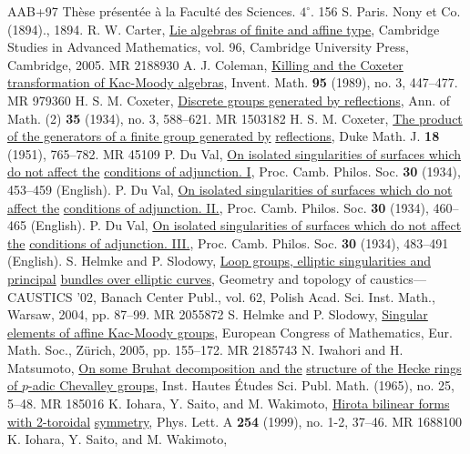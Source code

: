 \documentclass[11pt]{amsart}
\begin{document}
{\begin{thebibliography}{AAB+97}
Th\`{e}se pr\'{e}sent\'{e}e \`{a} la Facult\'{e} des Sciences. $4^{\circ}$. 156 S. Paris. 
Nony et Co. (1894)., 1894.
R. W. Carter, 
\underline{Lie algebras of finite and affine type}, 
Cambridge Studies in Advanced Mathematics, vol. 96, Cambridge University Press, 
Cambridge, 2005. MR 2188930
A. J. Coleman, 
\underline{Killing and the Coxeter transformation of Kac-Moody algebras}, 
Invent. Math. {\bf 95} (1989), no. 3, 447–477. MR 979360
H. S. M. Coxeter,
\underline{Discrete groups generated by reflections}, 
Ann. of Math. (2) {\bf 35} (1934), no. 3, 588–621. MR 1503182
H. S. M. Coxeter, 
\underline{The product of the generators of a finite group generated by}
\underline{reflections}, 
Duke Math. J. {\bf 18} (1951), 765–782. MR 45109
P. Du Val, 
\underline{On isolated singularities of surfaces which do not affect the} 
\underline{conditions of adjunction. I}, 
Proc. Camb. Philos. Soc. {\bf 30} (1934), 453–459 (English).
P. Du Val, 
\underline{On isolated singularities of surfaces which do not affect the} 
\underline{conditions of adjunction. II.}, 
Proc. Camb. Philos. Soc. {\bf 30} (1934), 460–465 (English).
P. Du Val, 
\underline{On isolated singularities of surfaces which do not affect the} 
\underline{conditions of adjunction. III.}, 
Proc. Camb. Philos. Soc. {\bf 30} (1934), 483–491 (English).
S. Helmke and P. Slodowy, 
\underline{Loop groups, elliptic singularities and principal}
\underline{bundles over elliptic curves}, 
Geometry and topology of caustics—CAUSTICS ’02, Banach Center Publ., vol. 62, 
Polish Acad. Sci. Inst. Math., Warsaw, 2004, pp. 87–99. MR 2055872
S. Helmke and P. Slodowy, 
\underline{Singular elements of affine Kac-Moody groups}, 
European Congress of Mathematics, Eur. Math. Soc., Zürich, 2005, pp. 155–172. 
MR 2185743
N. Iwahori and H. Matsumoto, 
\underline{On some Bruhat decomposition and the} 
\underline{structure of the Hecke rings of $p$-adic Chevalley groups}, 
Inst. Hautes \'{E}tudes Sci. Publ. Math. (1965), no. 25, 5–48. MR 185016
K. Iohara, Y. Saito, and M. Wakimoto, 
\underline{Hirota bilinear forms with 2-toroidal} 
\underline{symmetry}, Phys. Lett. A {\bf 254} (1999), no. 1-2, 37–46. MR 1688100
K. Iohara, Y. Saito, and M. Wakimoto, 

\end{thebibliography}}
\end{document}
